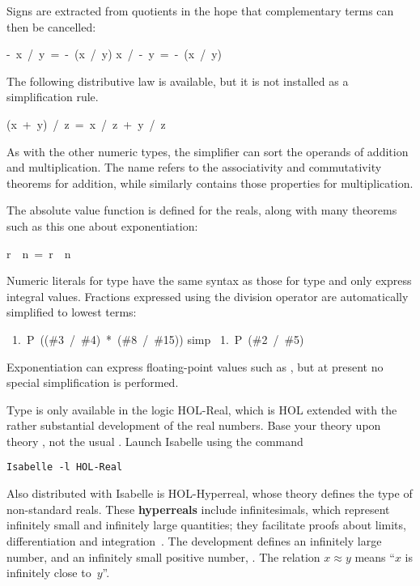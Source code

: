 Signs are extracted from quotients in the hope that complementary terms can
then be cancelled:
\begin{isabelle}
-\ x\ /\ y\ =\ -\ (x\ /\ y)
\isanewline
x\ /\ -\ y\ =\ -\ (x\ /\ y)
\end{isabelle}

The following distributive law is available, but it is not installed as a
simplification rule.
\begin{isabelle}
(x\ +\ y)\ /\ z\ =\ x\ /\ z\ +\ y\ /\ z%
\end{isabelle}

As with the other numeric types, the simplifier can sort the operands of
addition and multiplication.  The name  refers to the
associativity and commutativity theorems for addition, while similarly
 contains those properties for multiplication. 

The absolute value function  is
defined for the reals, along with many theorems such as this one about
exponentiation:
\begin{isabelle}
\isasymbar r\isasymbar \ \isacharcircum \ n\ =\ \isasymbar r\ \isacharcircum \ n\isasymbar 
{}
\end{isabelle}

Numeric literals for type  have the same syntax as those for type
 and only express integral values.  Fractions expressed
using the division operator are automatically simplified to lowest terms:
\begin{isabelle}
\ 1.\ P\ ((\#3\ /\ \#4)\ *\ (\#8\ /\ \#15))\isanewline
{} simp\isanewline
\ 1.\ P\ (\#2\ /\ \#5)
\end{isabelle}
Exponentiation can express floating-point values such as
, but at present no special simplification
is performed.


\begin{warn}
Type  is only available in the logic HOL-Real, which
is  HOL extended with the rather substantial development of the real
numbers.  Base your theory upon theory
, not the usual .  Launch Isabelle using the command 
\begin{verbatim}
Isabelle -l HOL-Real
\end{verbatim}
\end{warn}

Also distributed with Isabelle is HOL-Hyperreal,
whose theory  defines the type  of non-standard
reals.  These
\textbf{hyperreals} include infinitesimals, which represent infinitely
small and infinitely large quantities; they facilitate proofs
about limits, differentiation and integration~\cite{fleuriot-jcm}.  The
development defines an infinitely large number,  and an
infinitely small positive number, .  The 
relation $x\approx y$ means ``$x$ is infinitely close to~$y$''.
